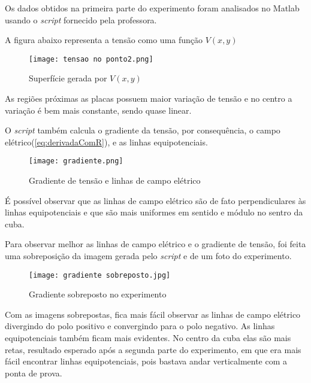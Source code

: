 \documentclass[
12pt,				%
oneside,			%
a4paper,			%
english,			%
french,				%
spanish,			%
brazil				%
]{abntex2}
\begin{document}
Os dados obtidos na primeira parte do experimento foram analisados no Matlab usando o \textit{script} fornecido pela professora.

A figura abaixo representa a tensão como uma função $V(x,y)$

\begin{figure}[H]
	\begin{center}
		\texttt{[image: tensao no ponto2.png]}
		\caption{Superfície gerada por $V(x,y)$}
		\label{fluxograma}
	\end{center}
\end{figure}

As regiões próximas as placas possuem maior variação de tensão e no centro a variação é bem mais constante, sendo quase linear.

\pagebreak
O \textit{script} também calcula o gradiente da tensão, por consequência, o campo elétrico(\autoref{eq:derivadaComR}), e as linhas equipotenciais.

\begin{figure}[H]
	\begin{center}
		\texttt{[image: gradiente.png]}
		\caption{Gradiente de tensão e linhas de campo elétrico}
		\label{fluxograma}
	\end{center}
\end{figure}

É possível observar que as linhas de campo elétrico são de fato perpendiculares às linhas equipotenciais e que são mais uniformes em sentido e módulo no sentro da cuba.
\pagebreak

Para observar melhor as linhas de campo elétrico e o gradiente de tensão, foi feita uma sobreposição da imagem gerada pelo \textit{script} e de um foto do experimento.

\begin{figure}[H]
	\begin{center}
		\texttt{[image: gradiente sobreposto.jpg]}
		\caption{Gradiente sobreposto no experimento}
		\label{gradienteSobreposto}
	\end{center}
\end{figure}

Com as imagens sobrepostas, fica mais fácil observar as linhas de campo elétrico divergindo do polo positivo e convergindo para o polo negativo. As linhas equipotenciais também ficam mais evidentes. No centro da cuba elas são mais retas, resultado esperado após a segunda parte do experimento, em que era mais fácil encontrar linhas equipotenciais, pois bastava andar verticalmente com a ponta de prova.
\end{document}

